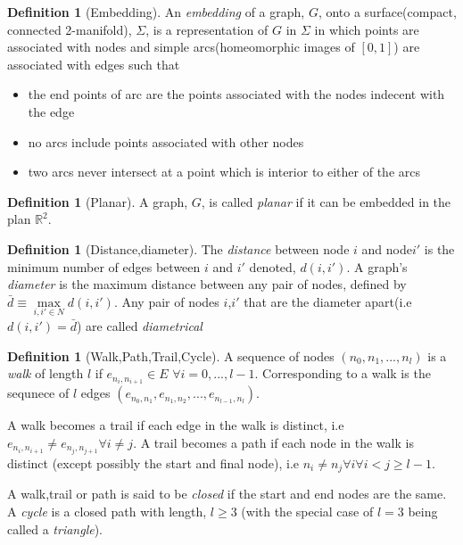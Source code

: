 \documentclass[a4paper,10pt]{article}
\theoremstyle{definition}
\newtheorem{definition}[theorem]{Definition}
\theoremstyle{definition}
\theoremstyle{remark}
\theoremstyle{definition}
\begin{document}
\begin{definition}[Embedding]
An \textit{embedding} of a graph, $G$, onto a surface(compact, connected 2-manifold), $\Sigma$, is a representation of $G$ in $\Sigma$ in which points are associated with nodes and simple arcs(homeomorphic images of $[0,1]$) are associated with edges such that
\begin{itemize}
\item the end points of arc are the points associated with the nodes indecent with the edge
\item no arcs include points associated with other nodes
\item two arcs never intersect at a point which is interior to either of the arcs
\end{itemize}
\end{definition}

\begin{definition}[Planar]
A graph, $G$, is called \textit{planar} if it can be embedded in the plan $\mathbb{R}^{2}$.
\end{definition}

\begin{definition}[Distance,diameter]
The \textit{distance} between node $i$ and node$i'$ is the minimum number of edges between $i$ and $i'$ denoted, $d(i,i')$.
A graph's \textit{diameter} is the maximum distance between any pair of nodes, defined by $\bar{d} \equiv \max\limits_{i,i' \in N} d(i,i')$. Any pair of nodes $i$,$i'$ that are the diameter apart(i.e $d(i,i')=\bar{d}$) are called \textit{diametrical} 
\end{definition}

\begin{definition}[Walk,Path,Trail,Cycle]
A sequence of nodes $(n_{0},n_{1},...,n_{l})$ is a \textit{walk} of length $l$ if $e_{n_{i},n_{i+1}} \in E$ $\forall i=0,...,l-1$. Corresponding to a walk is the sequnece of $l$ edges $(e_{n_{0},n_{1}},e_{n_{1},n_{2}},...,e_{n_{l-1},n_{l}})$.

A walk becomes a trail if each edge in the walk is distinct, i.e $e_{n_{i},n_{i+1}} \neq e_{n_{j},n_{j+1}} \forall i \neq j$. A trail becomes a path if each node in the walk is distinct (except possibly the start and final node), i.e $n_{i} \neq n_{j} \forall i \forall i < j \geq l-1$.

A walk,trail or path is said to be \textit{closed} if the start and end nodes are the same. A \textit{cycle} is a closed path with length, $l \geq 3$ (with the special case of $l=3$ being called a \textit{triangle}).
\end{definition}
\end{document}
